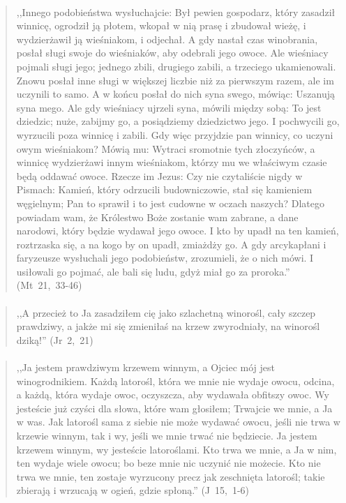 \documentclass[10pt,a4paper,oneside]{article}
\begin{document}
\paragraph{}
\begin{quote}
,,Innego podobieństwa wysłuchajcie: Był pewien gospodarz, który zasadził winnicę, ogrodził ją płotem, wkopał w nią prasę i zbudował wieżę, i wydzierżawił ją wieśniakom, i odjechał. A gdy nastał czas winobrania, posłał sługi swoje do wieśniaków, aby odebrali jego owoce. Ale wieśniacy pojmali sługi jego; jednego zbili, drugiego zabili, a trzeciego ukamienowali. Znowu posłał inne sługi w większej liczbie niż za pierwszym razem, ale im uczynili to samo. A w końcu posłał do nich syna swego, mówiąc: Uszanują syna mego. Ale gdy wieśniacy ujrzeli syna, mówili między sobą: To jest dziedzic; nuże, zabijmy go, a posiądziemy dziedzictwo jego. I pochwycili go, wyrzucili poza winnicę i zabili. Gdy więc przyjdzie pan winnicy, co uczyni owym wieśniakom? Mówią mu: Wytraci sromotnie tych złoczyńców, a winnicę wydzierżawi innym wieśniakom, którzy mu we właściwym czasie będą oddawać owoce. Rzecze im Jezus: Czy nie czytaliście nigdy w Pismach: Kamień, który odrzucili budowniczowie, stał się kamieniem węgielnym; Pan to sprawił i to jest cudowne w oczach naszych? Dlatego powiadam wam, że Królestwo Boże zostanie wam zabrane, a dane narodowi, który będzie wydawał jego owoce. I kto by upadł na ten kamień, roztrzaska się, a na kogo by on upadł, zmiażdży go. A gdy arcykapłani i faryzeusze wysłuchali jego podobieństw, zrozumieli, że o nich mówi. I usiłowali go pojmać, ale bali się ludu, gdyż miał go za proroka.'' \mbox{(Mt 21, 33-46)}
\end{quote}
\paragraph{}
\begin{quote}
,,A przecież to Ja zasadziłem cię jako szlachetną winorośl, cały szczep prawdziwy, a jakże mi się zmieniłaś na krzew zwyrodniały, na winorośl dziką!'' \mbox{(Jr 2, 21)}
\end{quote}
\paragraph{}
\begin{quote}
,,Ja jestem prawdziwym krzewem winnym, a Ojciec mój jest winogrodnikiem. Każdą latorośl, która we mnie nie wydaje owocu, odcina, a każdą, która wydaje owoc, oczyszcza, aby wydawała obfitszy owoc. Wy jesteście już czyści dla słowa, które wam głosiłem; Trwajcie we mnie, a Ja w was. Jak latorośl sama z siebie nie może wydawać owocu, jeśli nie trwa w krzewie winnym, tak i wy, jeśli we mnie trwać nie będziecie. Ja jestem krzewem winnym, wy jesteście latoroślami. Kto trwa we mnie, a Ja w nim, ten wydaje wiele owocu; bo beze mnie nic uczynić nie możecie. Kto nie trwa we mnie, ten zostaje wyrzucony precz jak zeschnięta latorośl; takie zbierają i wrzucają w ogień, gdzie spłoną.'' \mbox{(J 15, 1-6)}
\end{quote}
\end{document}
